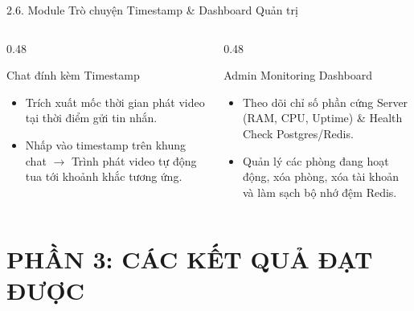 \documentclass[aspectratio=169,11pt]{beamer}
\begin{document}
\begin{frame}{2.6. Module Trò chuyện Timestamp \& Dashboard Quản trị}
    \begin{columns}[T]
        \begin{column}{0.48\textwidth}
            \begin{exampleblock}{Chat đính kèm Timestamp}
                \begin{itemize}
                    \item Trích xuất mốc thời gian phát video tại thời điểm gửi tin nhắn.
                    \item Nhấp vào timestamp trên khung chat $\rightarrow$ Trình phát video tự động tua tới khoảnh khắc tương ứng.
                \end{itemize}
            \end{exampleblock}
        \end{column}

        \begin{column}{0.48\textwidth}
            \begin{alertblock}{Admin Monitoring Dashboard}
                \begin{itemize}
                    \item Theo dõi chỉ số phần cứng Server (RAM, CPU, Uptime) \& Health Check Postgres/Redis.
                    \item Quản lý các phòng đang hoạt động, xóa phòng, xóa tài khoản và làm sạch bộ nhớ đệm Redis.
                \end{itemize}
            \end{alertblock}
        \end{column}
    \end{columns}
\end{frame}

\section{PHẦN 3: CÁC KẾT QUẢ ĐẠT ĐƯỢC}
\end{document}
